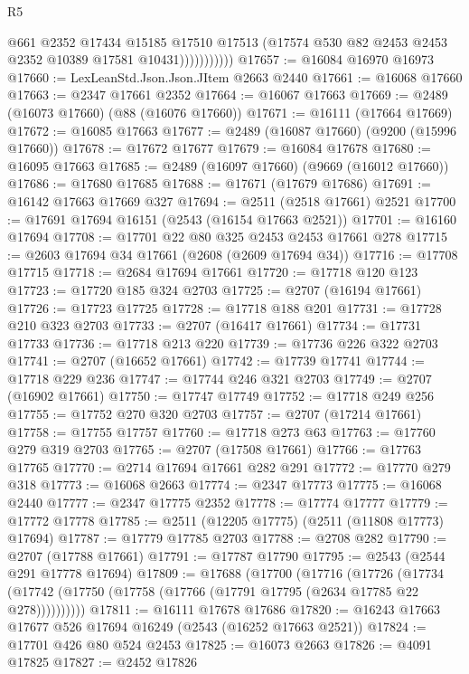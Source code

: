 \begin{lexlean}{R5}
\begin{coremodule}
                        @661
                        @2352
                        @17434
                        @15185
                        @17510
                        @17513
                        (@17574 @530 @82 @2453 @2453 @2352 @10389 @17581 @10431)))))))))))
@17657 := @16084 @16970 @16973
@17660 := LexLeanStd.Json.Json.JItem @2663 @2440
@17661 := @16068 @17660
@17663 := @2347 @17661 @2352
@17664 := @16067 @17663
@17669 := @2489 (@16073 @17660) (@88 (@16076 @17660))
@17671 := @16111 (@17664 @17669)
@17672 := @16085 @17663
@17677 := @2489 (@16087 @17660) (@9200 (@15996 @17660))
@17678 := @17672 @17677
@17679 := @16084 @17678
@17680 := @16095 @17663
@17685 := @2489 (@16097 @17660) (@9669 (@16012 @17660))
@17686 := @17680 @17685
@17688 := @17671 (@17679 @17686)
@17691 := @16142 @17663 @17669 @327
@17694 := @2511 (@2518 @17661) @2521
@17700 := @17691 @17694 @16151 (@2543 (@16154 @17663 @2521))
@17701 := @16160 @17694
@17708 := @17701 @22 @80 @325 @2453 @2453 @17661 @278
@17715 := @2603 @17694 @34 @17661 (@2608 (@2609 @17694 @34))
@17716 := @17708 @17715
@17718 := @2684 @17694 @17661
@17720 := @17718 @120 @123
@17723 := @17720 @185 @324 @2703
@17725 := @2707 (@16194 @17661)
@17726 := @17723 @17725
@17728 := @17718 @188 @201
@17731 := @17728 @210 @323 @2703
@17733 := @2707 (@16417 @17661)
@17734 := @17731 @17733
@17736 := @17718 @213 @220
@17739 := @17736 @226 @322 @2703
@17741 := @2707 (@16652 @17661)
@17742 := @17739 @17741
@17744 := @17718 @229 @236
@17747 := @17744 @246 @321 @2703
@17749 := @2707 (@16902 @17661)
@17750 := @17747 @17749
@17752 := @17718 @249 @256
@17755 := @17752 @270 @320 @2703
@17757 := @2707 (@17214 @17661)
@17758 := @17755 @17757
@17760 := @17718 @273 @63
@17763 := @17760 @279 @319 @2703
@17765 := @2707 (@17508 @17661)
@17766 := @17763 @17765
@17770 := @2714 @17694 @17661 @282 @291
@17772 := @17770 @279 @318
@17773 := @16068 @2663
@17774 := @2347 @17773
@17775 := @16068 @2440
@17777 := @2347 @17775 @2352
@17778 := @17774 @17777
@17779 := @17772 @17778
@17785 := @2511 (@12205 @17775) (@2511 (@11808 @17773) @17694)
@17787 := @17779 @17785 @2703
@17788 := @2708 @282
@17790 := @2707 (@17788 @17661)
@17791 := @17787 @17790
@17795 := @2543 (@2544 @291 @17778 @17694)
@17809 := @17688
    (@17700
      (@17716
        (@17726
          (@17734 (@17742 (@17750 (@17758 (@17766 (@17791 @17795 (@2634 @17785 @22 @278))))))))))
@17811 := @16111 @17678 @17686
@17820 := @16243 @17663 @17677 @526 @17694 @16249 (@2543 (@16252 @17663 @2521))
@17824 := @17701 @426 @80 @524 @2453
@17825 := @16073 @2663
@17826 := @4091 @17825
@17827 := @2452 @17826

\end{coremodule}
\end{lexlean}
